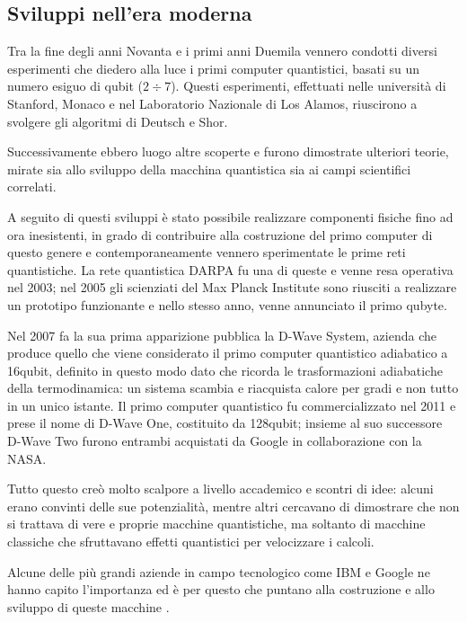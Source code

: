 \subsection{Sviluppi nell'era moderna}
Tra la fine degli anni Novanta e i primi anni Duemila vennero condotti diversi esperimenti che diedero alla luce i primi computer quantistici, basati su un numero esiguo di qubit ($2\div 7$).
Questi esperimenti, effettuati nelle università di Stanford, Monaco e nel Laboratorio Nazionale di Los Alamos, riuscirono a svolgere gli algoritmi di Deutsch e Shor.

Successivamente ebbero luogo altre scoperte e furono dimostrate ulteriori teorie, mirate sia allo sviluppo della macchina quantistica sia ai campi scientifici correlati.

A seguito di questi sviluppi è stato possibile realizzare componenti fisiche fino ad ora inesistenti, in grado di contribuire alla costruzione del primo computer di questo genere e contemporaneamente vennero sperimentate le prime reti quantistiche.
La rete quantistica DARPA \cite{qnetwork2005articolo} fu una di queste e venne resa operativa nel 2003; nel 2005 gli scienziati del Max Planck Institute sono riusciti a realizzare un prototipo funzionante e nello stesso anno, venne annunciato il primo qubyte.

Nel 2007 fa la sua prima apparizione pubblica la D-Wave System, azienda che produce quello che viene considerato il primo computer quantistico adiabatico a 16qubit, definito in questo modo dato che ricorda le trasformazioni adiabatiche della termodinamica: un sistema scambia e riacquista calore per gradi e non tutto in un unico istante.
Il primo computer quantistico fu commercializzato nel 2011 e prese il nome di D-Wave One, costituito da 128qubit; insieme al suo successore D-Wave Two furono entrambi acquistati da Google in collaborazione con la NASA.

Tutto questo creò molto scalpore a livello accademico e scontri di idee: alcuni erano convinti delle sue potenzialità, mentre altri cercavano di dimostrare che non si trattava di vere e proprie macchine quantistiche, ma soltanto di macchine classiche che sfruttavano effetti quantistici per velocizzare i calcoli.

Alcune delle più grandi aziende in campo tecnologico come IBM e Google ne hanno capito l'importanza ed è per questo che puntano alla costruzione e allo sviluppo di queste macchine \cite{preskill2018articolo}.
